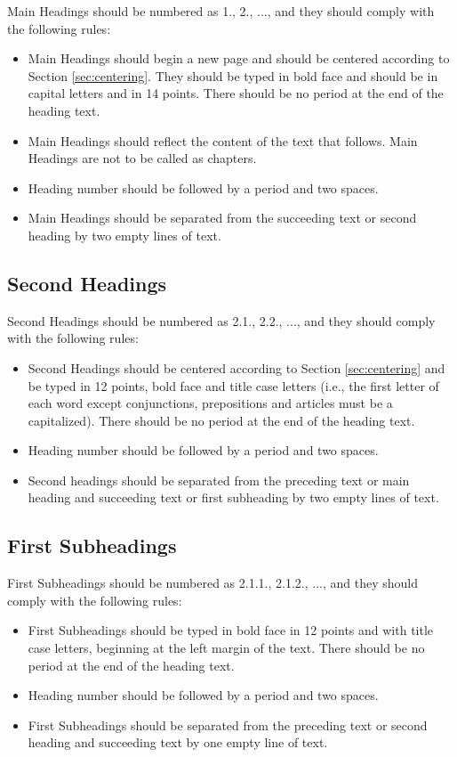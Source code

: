 \documentclass[a4paper,oneside,12pt]{report}
\numberwithin{equation}{chapter}
\begin{document}
Main Headings should be numbered as 1., 2., ..., and they should comply with the following rules:
\begin{itemize}
 \item Main Headings should begin a new page and should be centered according to
Section \ref{sec:centering}. They should be typed in bold face and should be in capital letters and in
14 points. There should be no period at the end of the heading text.
\item Main Headings should reflect the content of the text that follows.
Main Headings are not to be called as chapters.
\item Heading number should be followed by a period and two spaces.
\item Main Headings should be separated from the succeeding text or second heading by two empty lines of text.
\end{itemize}


\subsection{Second Headings}

Second Headings should be numbered as 2.1., 2.2., ..., and they should comply with the following rules:
\begin{itemize}
 \item Second Headings should be centered according to Section \ref{sec:centering} and be typed in 12 points, bold face and title case letters (i.e., the first letter of each word except conjunctions, prepositions and articles must be a capitalized). There should be no period at the end of the heading text.
\item Heading number should be followed by a period and two spaces.
\item Second headings should be separated from the preceding text or main heading and succeeding text or first subheading by two empty lines of text.
\end{itemize}


\subsection{First Subheadings}

First Subheadings should be numbered as 2.1.1., 2.1.2., ..., and they should comply with the following rules:

\begin{itemize}
\item First Subheadings should be typed in bold face in 12 points and with title
case letters, beginning at the left
margin of the text. There should be no period at the end of the heading text.
\item Heading number should be followed by a period and two spaces.
\item First Subheadings should be separated from the preceding text or second heading and succeeding text by one empty line of text.
\end{itemize}
\end{document}
